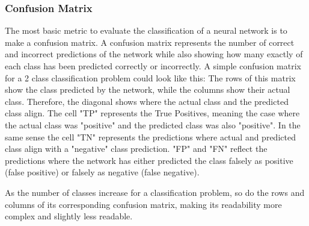 \subsubsection{Confusion Matrix}
The most basic metric to evaluate the classification of a neural network is to make a confusion matrix. A confusion matrix represents the number of correct and incorrect predictions of the network while also showing how many exactly of each class has been predicted correctly or incorrectly. A simple confusion matrix for a 2 class classification problem could look like this:
The rows of this matrix show the class predicted by the network, while the columns show their actual class. Therefore, the diagonal shows where the actual class and the predicted class align. The cell "TP" represents the True Positives, meaning the case where the actual class was "positive" and the predicted class was also "positive". In the same sense the cell "TN" represents the predictions where actual and predicted class align with a "negative" class prediction. "FP" and "FN" reflect the predictions where the network has either predicted the class falsely as positive (false positive) or falsely as negative (false negative).

As the number of classes increase for a classification problem, so do the rows and columns of its corresponding confusion matrix, making its readability more complex and slightly less readable.

